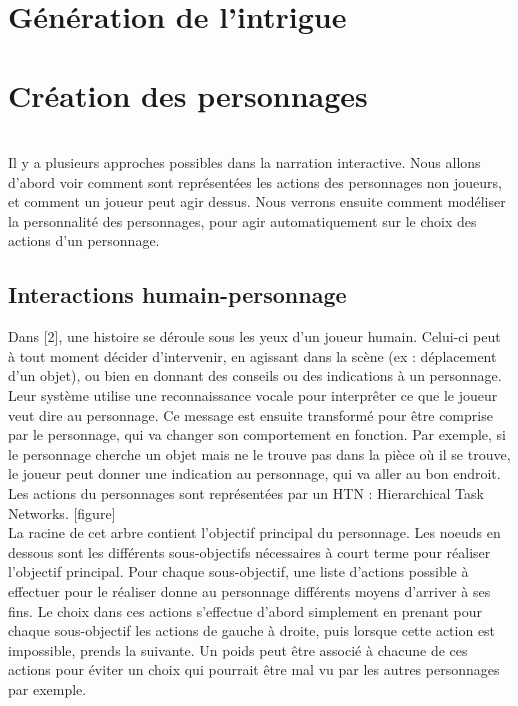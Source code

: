 \documentclass[asi]{picINSA}
\begin{document}
	
	\couverture{}

\tableofcontents{}

\chapter{Génération de l'intrigue}

\chapter{Création des personnages}
~\\
Il y a plusieurs approches possibles dans la narration interactive. Nous allons d'abord voir comment sont représentées les actions des personnages non joueurs, et comment un joueur peut agir dessus. Nous verrons ensuite comment modéliser la personnalité des personnages, pour agir automatiquement sur le choix des actions d'un personnage.\\

\section{Interactions humain-personnage}

Dans [2], une histoire se déroule sous les yeux d'un joueur humain. Celui-ci peut à tout moment décider d'intervenir, en agissant dans la scène (ex : déplacement d'un objet), ou bien en donnant des conseils ou des indications à un personnage. Leur système utilise une reconnaissance vocale pour interprêter ce que le joueur veut dire au personnage. Ce message est ensuite transformé pour être comprise par le personnage, qui va changer son comportement en fonction. Par exemple, si le personnage cherche un objet mais ne le trouve pas dans la pièce où il se trouve, le joueur peut donner une indication au personnage, qui va aller au bon endroit.\\

Les actions du personnages sont représentées par un HTN : Hierarchical Task Networks. [figure]\\

La racine de cet arbre contient l'objectif principal du personnage. Les noeuds en dessous sont les différents sous-objectifs nécessaires à court terme pour réaliser l'objectif principal. Pour chaque sous-objectif, une liste d'actions possible à effectuer pour le réaliser donne au personnage différents moyens d'arriver à ses fins. Le choix dans ces actions s'effectue d'abord simplement en prenant pour chaque sous-objectif les actions de gauche à droite, puis lorsque cette action est impossible, prends la suivante. Un poids peut être associé à chacune de ces actions pour éviter un choix qui pourrait être mal vu par les autres personnages par exemple.\\
\end{document}
